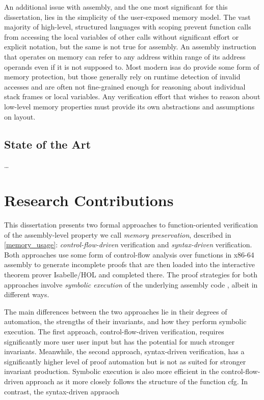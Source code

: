 An additional issue with assembly,
and the one most significant for this dissertation,
lies in the simplicity of the user-exposed memory model.
The vast majority of high-level, structured languages with scoping
prevent function calls from accessing the local variables of other calls
without significant effort or explicit notation, but the same is not true for assembly.
An assembly instruction that operates on memory can refer to any
address within range of its address operands even if it is not supposed to.
Most modern \acp{isa} do provide some form of memory protection,
but those generally rely on runtime detection of invalid accesses
and are often not fine-grained enough for reasoning about individual stack frames
or local variables.
Any verification effort that wishes to reason about low-level memory properties
must provide its own abstractions and assumptions on layout.

\subsection{State of the Art}
\todo\dots

\section{Research Contributions}
This dissertation presents two formal approaches to function-oriented verification
of the assembly-level property we call \emph{memory preservation},
described in \cref{memory_usage}:
\emph{control-flow-driven} verification and \emph{syntax-driven} verification.
Both approaches use some form of control-flow analysis over functions in x86-64 assembly
to generate incomplete proofs
that are then loaded into the interactive theorem prover Isabelle/HOL
and completed there. The proof strategies for both approaches involve
\emph{symbolic execution} of the underlying assembly code \autocite{king1976symbolic},
albeit in different ways.

The main differences between the two approaches
lie in their degrees of automation, the strengths of their invariants,
and how they perform symbolic execution.
The first approach, control-flow-driven verification,
requires significantly more user user input but has the potential for much stronger invariants.
Meanwhile, the second approach, syntax-driven verification,
has a significantly higher level of proof automation but is not as suited for stronger invariant production.
Symbolic execution is also more efficient in the control-flow-driven approach
as it more closely follows the structure of the function \ac{cfg}.
In contrast, the syntax-driven appraoch

